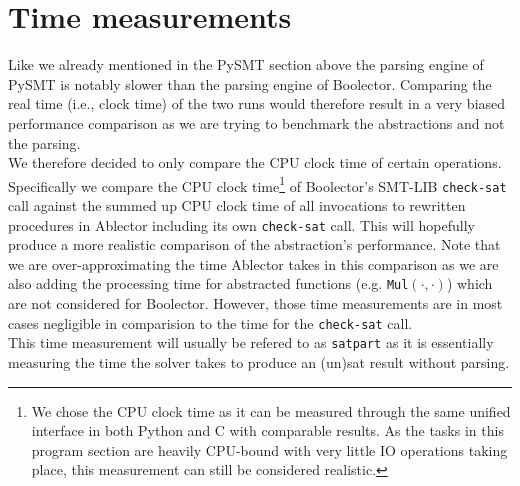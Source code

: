 \section{Time measurements}
Like we already mentioned in the PySMT section above the parsing engine of PySMT is notably slower than the parsing engine of Boolector.
Comparing the real time (i.e., clock time) of the two runs would therefore result in a very biased performance comparison as we are trying
to benchmark the abstractions and not the parsing.\\
We therefore decided to only compare the CPU clock time of certain operations.
Specifically we compare the CPU clock time\footnote{We chose the CPU clock time as it can be measured through the same unified interface in both Python and C with comparable results. As the tasks in this program section are heavily CPU-bound with very little IO operations taking place, this measurement can still be considered realistic.} of Boolector's SMT-LIB \texttt{check-sat} call
against the summed up CPU clock time of all invocations to rewritten procedures in Ablector including its own \texttt{check-sat} call.
This will hopefully produce a more realistic comparison of the abstraction's performance.
Note that we are over-approximating the time Ablector takes in this comparison as we are
also adding the processing time for abstracted functions (e.g. \texttt{Mul$\left(\cdot,\cdot\right)$}) which are not considered for Boolector.
However, those time measurements are in most cases negligible in comparision to the time for the \texttt{check-sat} call.\\
This time measurement will usually be refered to as \texttt{satpart} as it is essentially measuring the time the solver takes to produce an (un)sat result without parsing.